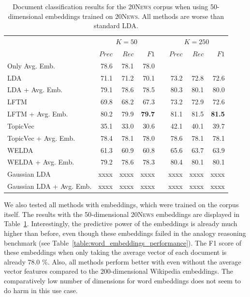 \documentclass[
        a4paper,
        titlepage,
        twoside,
        parskip
        ]{scrbook}
\newcommand{\ra}[1]{\renewcommand{\arraystretch}{#1}}
\theoremstyle{break}
\begin{document}
\begin{table}[]
  \ra{1.3}
  \centering
  \caption{Document classification results for the \textsc{20News} corpus when using 50-dimensional embeddings trained on \textsc{20News}.
  All methods are worse than standard LDA.}
  \label{table:document_classification_dim-50}
  \begin{tabular}{lrrrcrrr}
    \toprule
    \multirow{2}{*}{} & \multicolumn{3}{c}{$K = 50$} & \phantom{a} & \multicolumn{3}{c}{$K = 250$} \\ \cmidrule{2-4} \cmidrule{6-8}
                      & $Prec$    & $Rec$     & $F1$     && $Prec$    & $Rec$   & $F1$     \\ \midrule
                      Only Avg. Emb.           & 78.6    & 78.1    & 78.0   && \multicolumn{3}{l}{}        \\
                      LDA                      & 71.1    & 71.2    & 70.1   && 73.2    & 72.8     & 72.6   \\
                      LDA + Avg. Emb.          & 79.1    & 78.6    & 78.5   && 80.3    & 80.1     & 80.0   \\
                      LFTM                     & 69.8    & 68.2    & 67.3   && 73.2    & 72.9     & 72.6   \\
                      LFTM + Avg. Emb.         & 80.2    & 79.9    & \textbf{79.7}   && 81.1    & 81.5     & \textbf{81.5}   \\
                      TopicVec                 & 35.1    & 33.0    & 30.6   && 42.1    & 40.1     & 39.7   \\
                      TopicVec + Avg. Emb.     & 78.4    & 78.1    & 78.0   && 78.6    & 78.1     & 78.1   \\
                      WELDA                    & 61.3    & 60.9    & 60.8   && 65.6    & 63.7     & 63.9   \\ %
                      WELDA + Avg. Emb.        & 79.2    & 78.6    & 78.3   && 80.4    & 80.1     & 80.1   \\
                      Gaussian LDA             & xxxx    & xxxx    & xxxx   && xxxx    & xxxx     & xxxx   \\
                      Gaussian LDA + Avg. Emb. & xxxx    & xxxx    & xxxx   && xxxx    & xxxx     & xxxx   \\
  \bottomrule
  \end{tabular}
\end{table}

We also tested all methods with embeddings, which were trained on the corpus itself.
The results with the 50-dimensional \textsc{20News} embeddings are displayed in Table~\ref{table:document_classification_dim-50}.
Interestingly, the predictive power of the embeddings is already much higher than before, even though these embeddings failed in the analogy reasoning benchmark (see Table~\ref{table:word_embeddings_performance}).
The F1 score of these embeddings when only taking the average vector of each document is already 78.0 \%.
Also, all methods perform better with even without the average vector features compared to the 200-dimensional Wikipedia embeddings.
The comparatively low number of dimensions for word embeddings does not seem to do harm in this use case.
\end{document}
